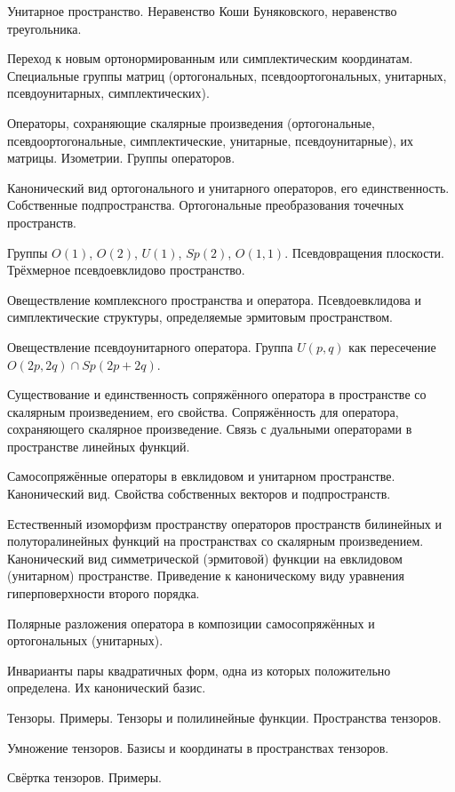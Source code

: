 \documentclass[a4paper]{article}
\begin{document}
\begin{nums}{-2}
\item Унитарное пространство. Неравенство Коши Буняковского, неравенство треугольника.
\item Переход к новым ортонормированным или симплектическим координатам. Специальные группы матриц
(ортогональных, псевдоортогональных, унитарных, псевдоунитарных, симплектических).
\item Операторы, сохраняющие скалярные произведения (ортогональные, псевдоортогональные,
симплектические, унитарные, псевдоунитарные), их матрицы. Изометрии. Группы операторов.
\item Канонический вид ортогонального и унитарного операторов, его единственность.
Собственные подпространства. Ортогональные преобразования точечных пространств.
\item Группы $O(1)$, $O(2)$, $U(1)$, $Sp(2)$, $O(1,1)$. Псевдовращения плоскости.
Трёхмерное псевдоевклидово пространство.
\item Овеществление комплексного пространства и оператора. Псевдоевклидова и симплектические структуры,
определяемые эрмитовым пространством.
\item Овеществление псевдоунитарного оператора. Группа $U(p,q)$ как пересечение $O(2p,2q) \cap Sp(2p+2q)$.
\item Существование и единственность сопряжённого оператора в пространстве со скалярным произведением,
его свойства. Сопряжённость для оператора, сохраняющего скалярное произведение. Связь с дуальными операторами
в пространстве линейных функций.
\item Самосопряжённые операторы в евклидовом и унитарном пространстве. Канонический вид.
Свойства собственных векторов и подпространств.
\item Естественный изоморфизм пространству операторов пространств билинейных и полуторалинейных
функций на пространствах со скалярным произведением. Канонический вид симметрической (эрмитовой)
функции на евклидовом (унитарном) пространстве. Приведение к каноническому виду уравнения гиперповерхности
второго порядка.
\item Полярные разложения оператора в композиции самосопряжённых и ортогональных (унитарных).
\item Инварианты пары квадратичных форм, одна из которых положительно определена. Их канонический базис.
\item Тензоры. Примеры. Тензоры и полилинейные функции. Пространства тензоров.
\item Умножение тензоров. Базисы и координаты в пространствах тензоров.
\item Свёртка тензоров. Примеры.

\end{nums}
\end{document}
